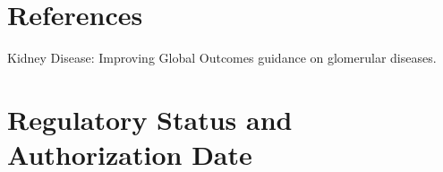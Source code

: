 \section*{References}
Kidney Disease: Improving Global Outcomes guidance on glomerular diseases.

\clearpage


\section*{Regulatory Status and Authorization Date}

\clearpage
